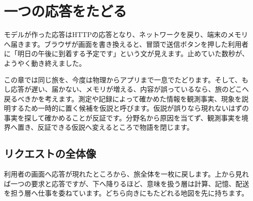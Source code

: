 \chapter{一つの応答をたどる}
\label{chap:practice}

\begin{chapterabstract}
モデルが作った応答はHTTPの応答となり、ネットワークを戻り、端末のメモリへ届きます。ブラウザが画面を書き換えると、冒頭で送信ボタンを押した利用者に「明日の午後に到着する予定です」という文が見えます。止めていた数秒が、ようやく動き終えました。

この章では同じ旅を、今度は物理からアプリまで一息でたどります。そして、もし応答が遅い、届かない、メモリが増える、内容が誤っているなら、旅のどこへ戻るべきかを考えます。測定や記録によって確かめた情報を観測事実、現象を説明するため一時的に置く候補を仮説と呼びます。仮説が誤りなら現れないはずの事実を探して確かめることが反証です。分野名から原因を当てず、観測事実を境界へ置き、反証できる仮説へ変えるところで物語を閉じます。
\end{chapterabstract}


\section{リクエストの全体像}
\label{sec:07-practice-01}

利用者の画面へ応答が現れたところから、旅全体を一枚に戻します。上から見れば一つの要求と応答ですが、下へ降りるほど、意味を扱う層は計算、記憶、配送を担う層へ仕事を委ねています。どちら向きにもたどれる地図を先に持ちます。

\begingroup
  \centering
  \vspace{3mm}
\begingroup
